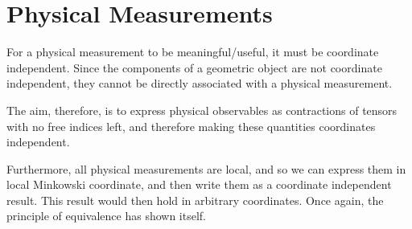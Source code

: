\section{Physical Measurements}
For a physical measurement to be meaningful/useful, it must be coordinate independent. Since the components of a geometric object are not coordinate independent, they cannot be directly associated with a physical measurement. \par The aim, therefore, is to express physical observables as contractions of tensors with no free indices left, and therefore making these quantities coordinates independent. \par Furthermore, all physical measurements are local, and so we can express them in local Minkowski coordinate, and then write them as a coordinate independent result. This result would then hold in arbitrary coordinates. Once again, the principle of equivalence has shown itself.